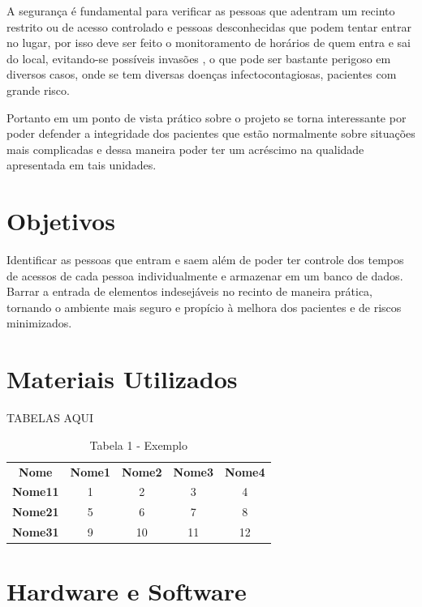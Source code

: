 \documentclass[conference,compsoc]{IEEEtran}
\begin{document}
A segurança é fundamental para verificar as pessoas que adentram um recinto restrito ou de acesso controlado e pessoas desconhecidas que podem tentar entrar no lugar, por isso deve ser feito o monitoramento de horários de quem entra e sai do local, evitando-se possíveis invasões , o que pode ser bastante perigoso em diversos casos, onde se tem diversas doenças infectocontagiosas, pacientes com grande risco.

 Portanto em um ponto de vista prático sobre o projeto se torna interessante por poder defender a integridade dos pacientes que estão normalmente sobre situações mais complicadas e dessa maneira poder ter um acréscimo na qualidade apresentada em tais unidades.
 
 \section{Objetivos}
Identificar as pessoas que entram e saem além de poder ter controle dos tempos de acessos de cada pessoa individualmente e armazenar em um banco de dados. Barrar a entrada de elementos indesejáveis no recinto de maneira prática, tornando o ambiente mais seguro e propício à melhora dos pacientes e de riscos minimizados.

\section{Materiais Utilizados}
TABELAS AQUI

\begin{table}[tbp]
\caption{Tabela 1 - Exemplo}
\label{my-label}
\begin{tabular}{ccccc}
\textbf{Nome}   & \textbf{Nome1} & \textbf{Nome2} & \textbf{Nome3} & \textbf{Nome4} \\
\textbf{Nome11} & 1              & 2              & 3              & 4              \\
\textbf{Nome21} & 5              & 6              & 7              & 8              \\
\textbf{Nome31} & 9              & 10             & 11             & 12            
\end{tabular}
\end{table}

\section{Hardware e Software}
\end{document}
